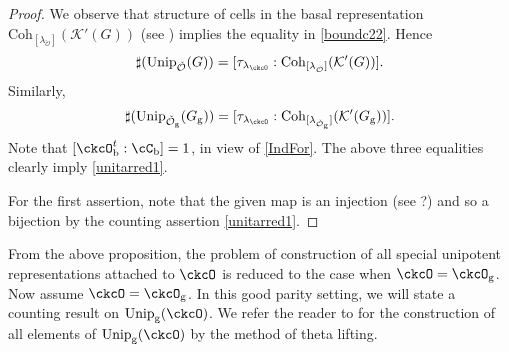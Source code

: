 \documentclass[12pt,a4paper]{amsart}
\newcommand{\CK}{{\mathcal {K}}}
\newcommand{\CO}{{\mathcal {O}}}
\numberwithin{equation}{section}
\theoremstyle{remark}
\def\Unip{\mathrm{Unip}}
\def\lamck{\lambda_\ckcO}
\def\Cint#1{\Coh_{[#1]}}
\def\Coh{\mathrm{Coh}}
\begin{document}
\begin{proof} We  observe that structure of cells in the basal representation  $\Coh_{[\lambda_{\check \CO}]}(\CK'(G))$ (see \cite[Theorem 5]{Bo}) implies the equality in \eqref{boundc22}. Hence 
\[
     \sharp(\Unip_{\check \CO}(G)) =[\tau_{\lamck}: \Coh_{[\lambda_{\check \CO}]}(\CK'(G))]. 
 \]
 Similarly, 
 \[
     \sharp(\Unip_{\check \CO_\mathrm g}(G_\mathrm g)) = [\tau_{\lamck}: \Coh_{[\lambda_{\check \CO_\mathrm g}]}(\CK'(G_\mathrm g))]. 
 \]
 Note that $[\ckcO_{\mathrm b}^{t}:\cC_{\mathrm b}]=1$, in view of \eqref{IndFor}. The above three equalities clearly imply \eqref{unitarred1}. 
 
For the first assertion, note that the given map is an injection (see ?) and so a bijection by the counting assertion  \eqref{unitarred1}.
\end{proof}


From the above proposition, the problem of construction of all special unipotent representations attached to $\ckcO$ is reduced to the case when $\ckcO = \ckcO_{\mathrm g}$.
Now assume $\ckcO = \ckcO_{\mathrm g}$.
In this good parity setting, we will state a counting result on
$\Unip_{\mathrm g}(\ckcO)$.  We refer the reader to \cite{BMSZ2} for the construction of all elements of $\Unip_{\mathrm g}(\ckcO)$ by the method of theta lifting.
\end{document}

